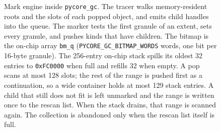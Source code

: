 \begin{figure}[p]
\centering
{}
\caption{Mark engine inside \texttt{pycore\_gc}.
The tracer walks memory-resident roots and the slots of each popped object, and emits child handles into the queue.
The marker tests the first granule of an extent, sets every granule, and pushes kinds that have children.
The bitmap is the on-chip array \texttt{bm\_q} (\texttt{PYCORE\_GC\_BITMAP\_WORDS} words, one bit per 16-byte granule).
The 256-entry on-chip stack spills its oldest 32 entries to \texttt{0xFC0000} when full and refills 32 when empty.
A pop scans at most 128 slots; the rest of the range is pushed first as a continuation, so a wide container holds at most 129 stack entries.
A child that still does not fit is left unmarked and the range is written once to the rescan list.
When the stack drains, that range is scanned again.
The collection is abandoned only when the rescan list itself is full.}
\label{fig:gc-mark}
\end{figure}

